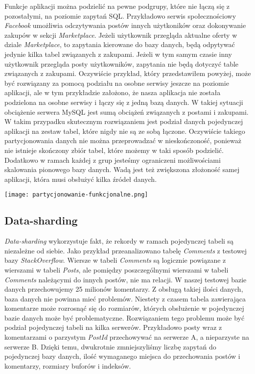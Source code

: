 Funkcje aplikacji można podzielić na pewne podgrupy, które nie łączą się z pozostałymi, na poziomie zapytań SQL. Przykładowo serwis społecznościowy \textit{Facebook} umożliwia odczytywania postów innych użytkoników oraz dokonywanie zakupów w sekcji \textit{Marketplace}. Jeżeli użytkownik przegląda aktualne oferty w dziale \textit{Marketplace}, to zapytania kierowane do bazy danych, będą odpytywać jedynie kilka tabel związanych z zakupami. Jeżeli w tym samym czasie inny użytkownik przegląda posty użytkowników, zapytania nie będą dotyczyć table związanych z zakupami. Oczywiście przykład, który przedstawiłem powyżej, może być rozwiązany za pomocą podziału na osobne serwisy jeszcze na poziomie aplikacji, ale w tym przykładzie założono, że nasza aplikacja nie została podzielona na osobne serwisy i łączy się z jedną bazą danych. W takiej sytuacji obciążenie serwera MySQL jest sumą obciążeń związanych z postami i zakupami. W takim przypadku skutecznym rozwiązaniem jest podział danych pojedynczej aplikacji na zestaw tabel, które nigdy nie są ze sobą łączone. Oczywiście takiego partycjonowania danych nie można przeprowadzać w nieskończoność, ponieważ nie istnieje skończony zbiór tabel, które możemy w taki sposób podzielić. Dodatkowo w ramach każdej z grup jesteśmy ograniczeni możliwościami skalowania pionowego bazy danych. Wadą jest też zwiększona złożoność samej aplikacji, która musi obsłużyć kilka źródeł danych. 

\begin{center}
	\texttt{[image: partycjonowanie-funkcjonalne.png]} 
\end{center}


\subsection{Data-sharding}
 
\textit{Data-sharding} wykorzystuje fakt, że rekordy w ramach pojedynczej tabeli są niezależne od siebie. Jako przykład przeanalizowano tabelę \textit{Comments} z testowej bazy \textit{StackOverflow}.
Wiersze w tabeli \textit{Comments} są logicznie powiązane z wierszami w tabeli \textit{Posts}, ale pomiędzy poszczególnymi wierszami w tabeli \textit{Comments} należącymi do innych postów, nie ma relacji. W naszej testowej bazie danych przechowujemy 25 milionów komentarzy. Z obsługą takiej ilości danych, baza danych nie powinna mieć problemów. Niestety z czasem tabela zawierająca komentarze może rozrosnąć się do rozmiarów, których obsłużenie w pojedynczej bazie danych może być problematyczne. Rozwiązaniem tego problemu może być podział pojedynczej tabeli na kilka serwerów. Przykładowo posty wraz z komentarzami o parzystym \textit{PostId} przechowywać na serwerze A, a nieparzyste na serwerze B. Dzięki temu, dwukrotnie zmniejszyliśmy liczbę zapytań do pojedynczej bazy danych, ilość wymaganego miejsca do przechowania postów i komentarzy, rozmiary buforów i indeksów. 


